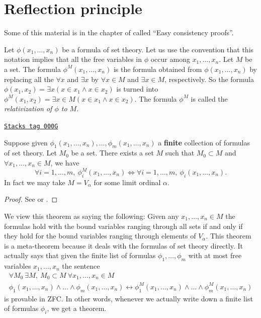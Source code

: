 \section{Reflection principle}
\label{sets-section-reflection-principle}
Some of this material is in the chapter of \cite{Kunen} called
``Easy consistency proofs''.

\medskip\noindent
Let $\phi(x_1, \ldots, x_n)$ be a formula of set theory.
Let us use the convention that this notation implies that
all the free variables in $\phi$ occur among $x_1, \ldots, x_n$.
Let $M$ be a set.
The formula $\phi^M(x_1, \ldots, x_n)$ is the
formula obtained from $\phi(x_1, \ldots, x_n)$ by replacing all the
$\forall x$ and $\exists x$ by $\forall x\in M$ and $\exists x\in M$,
respectively. So the formula
$\phi(x_1, x_2) = \exists x (x\in x_1 \wedge x\in x_2)$
is turned  into
$\phi^M(x_1, x_2) = \exists x \in M (x\in x_1 \wedge x\in x_2)$.
The formula $\phi^M$ is called the {\it relativization of $\phi$
to $M$}.

\begin{theorem}
\label{sets-theorem-reflection-principle}
\href{https://stacks.math.columbia.edu/tag/000G}{\texttt{Stacks tag 000G}}

Suppose given $\phi_1(x_1, \ldots, x_n), \ldots, \phi_m(x_1, \ldots, x_n)$
a {\bf finite} collection of
formulas of set theory. Let $M_0$ be a set.
There exists a set $M$ such that
$M_0 \subset M$ and
$\forall x_1, \ldots, x_n \in M$, we have
$$
\forall i = 1, \ldots, m, \ \phi_i^{M}(x_1, \ldots, x_n)
\Leftrightarrow
\forall i = 1, \ldots, m, \ \phi_i(x_1, \ldots, x_n).
$$
In fact we may take $M = V_\alpha$ for some limit ordinal $\alpha$.
\end{theorem}

\begin{proof}
See \cite[Theorem 12.14]{Jech} or \cite[Theorem 7.4]{Kunen}.
\end{proof}

We view this theorem as saying the following: Given any
$x_1, \ldots, x_n \in M$ the formulas hold with the bound variables ranging
through all sets if and only if they hold for the bound variables ranging
through elements of $V_\alpha$. This theorem is a meta-theorem because
it deals with the formulas of set theory directly.
It actually says that given the finite list of formulas
$\phi_1, \ldots, \phi_m$ with at most free variables $x_1, \ldots, x_n$
the sentence
$$
\begin{matrix}
\forall M_0\ \exists M, \ M_0 \subset M\ \forall x_1, \ldots, x_n \in M \\
\phi_1(x_1, \ldots, x_n) \wedge \ldots \wedge \phi_m(x_1, \ldots, x_n)
\leftrightarrow
\phi_1^M(x_1, \ldots, x_n) \wedge \ldots \wedge \phi_m^M(x_1, \ldots, x_n)
\end{matrix}
$$
is provable in ZFC. In other words, whenever we actually write down
a finite list of formulas $\phi_i$, we get a theorem.


